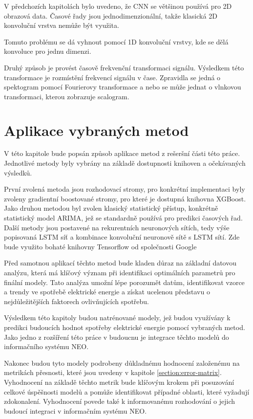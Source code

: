 \documentclass[FM,BP,fonts]{tulthesis}
\begin{document}
V předchozích kapitolách bylo uvedeno, že CNN se většinou používá pro 2D obrazová data. Časové řady jsou  jednodimenzionální, takže klasická 2D konvoluční vrstva nemůže být využita.

Tomuto problému se dá vyhnout pomocí 1D konvoluční vrstvy, kde se dělá konvoluce pro jednu dimenzi. \cite{article}

Druhý způsob je provést časově frekvenční transformaci signálu. \cite{10201713} Výsledkem této transformace je rozmístění frekvencí signálu v čase. Zpravidla se jedná o spektogram pomocí Fourierovy transformace a nebo se může jednat o vlnkovou transformaci, kterou zobrazuje scalogram.


\chapter{Aplikace vybraných metod}
V této kapitole bude popsán způsob aplikace metod z rešeršní části této práce. Jednotlivé metody byly vybrány na základě dostupnosti knihoven a očekávaných výsledků.

První zvolená metoda jsou rozhodovací stromy, pro konkrétní implementaci byly zvoleny gradientní boostované stromy, pro které je dostupná knihovna XGBoost. Jako druhou metodou byl zvolen klasický statistický přístup, konkrétně statistický model ARIMA, jež se standardně používá pro predikci časových řad. Další metody jsou postavené na rekurentních neuronových sítích, tedy výše popisovaná LSTM síť a kombinace konvoluční neuronově sítě s LSTM sítí. Zde bude využito bohaté knihovny Tensorflow od společnosti Google

Před samotnou aplikací těchto metod bude kladen důraz na základní datovou analýzu, která má klíčový význam při identifikaci optimálních parametrů pro finální modely. Tato analýza umožní lépe porozumět datům, identifikovat vzorce a trendy ve spotřebě elektrické energie a získat ucelenou představu o nejdůležitějších faktorech ovlivňujících spotřebu.

Výsledkem této kapitoly budou natrénované modely, jež budou využívány k predikci budoucích hodnot spotřeby elektrické energie pomocí vybraných metod. Jako jedno z rozšíření této práce v budoucnu je integrace těchto modelů do informačního systému NEO.  

Nakonec budou tyto modely podrobeny důkladnému hodnocení založenému na metrikách přesnosti, které jsou uvedeny v kapitole \ref{section:error-matrix}. Vyhodnocení na základě těchto metrik bude klíčovým krokem při posuzování celkové úspěšnosti modelů a pomůže identifikovat případné oblasti, které vyžadují zdokonalení. Vyhodnocení povede také k informovanému rozhodování o jejich budoucí integraci v informačním systému NEO.
\end{document}
